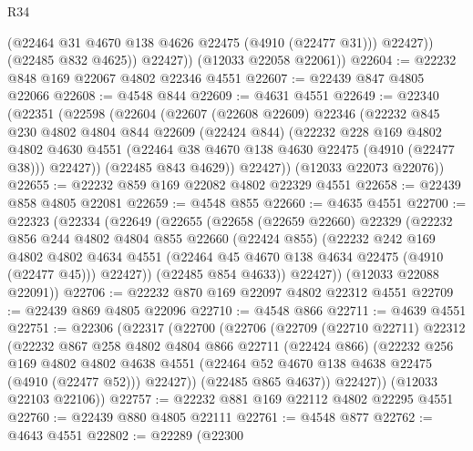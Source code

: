 \begin{lexlean}{R34}
\begin{coremodule}
                (@22464 @31 @4670 @138 @4626 @22475 (@4910 (@22477 @31)))
                @22427))
            (@22485 @832 @4625))
          @22427))
      (@12033 @22058 @22061))
@22604 := @22232 @848 @169 @22067 @4802 @22346 @4551
@22607 := @22439 @847 @4805 @22066
@22608 := @4548 @844
@22609 := @4631 @4551
@22649 := @22340
    (@22351
      (@22598
        (@22604
          (@22607
            (@22608 @22609)
            @22346
            (@22232
              @845
              @230
              @4802
              @4804
              @844
              @22609
              (@22424 @844)
              (@22232
                @228
                @169
                @4802
                @4802
                @4630
                @4551
                (@22464 @38 @4670 @138 @4630 @22475 (@4910 (@22477 @38)))
                @22427))
            (@22485 @843 @4629))
          @22427))
      (@12033 @22073 @22076))
@22655 := @22232 @859 @169 @22082 @4802 @22329 @4551
@22658 := @22439 @858 @4805 @22081
@22659 := @4548 @855
@22660 := @4635 @4551
@22700 := @22323
    (@22334
      (@22649
        (@22655
          (@22658
            (@22659 @22660)
            @22329
            (@22232
              @856
              @244
              @4802
              @4804
              @855
              @22660
              (@22424 @855)
              (@22232
                @242
                @169
                @4802
                @4802
                @4634
                @4551
                (@22464 @45 @4670 @138 @4634 @22475 (@4910 (@22477 @45)))
                @22427))
            (@22485 @854 @4633))
          @22427))
      (@12033 @22088 @22091))
@22706 := @22232 @870 @169 @22097 @4802 @22312 @4551
@22709 := @22439 @869 @4805 @22096
@22710 := @4548 @866
@22711 := @4639 @4551
@22751 := @22306
    (@22317
      (@22700
        (@22706
          (@22709
            (@22710 @22711)
            @22312
            (@22232
              @867
              @258
              @4802
              @4804
              @866
              @22711
              (@22424 @866)
              (@22232
                @256
                @169
                @4802
                @4802
                @4638
                @4551
                (@22464 @52 @4670 @138 @4638 @22475 (@4910 (@22477 @52)))
                @22427))
            (@22485 @865 @4637))
          @22427))
      (@12033 @22103 @22106))
@22757 := @22232 @881 @169 @22112 @4802 @22295 @4551
@22760 := @22439 @880 @4805 @22111
@22761 := @4548 @877
@22762 := @4643 @4551
@22802 := @22289
    (@22300

\end{coremodule}
\end{lexlean}
